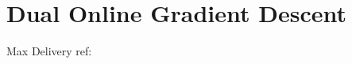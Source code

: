 \documentclass[../main.tex]{subfiles}
\begin{document}
	\chapter{Dual Online Gradient Descent}
	
	
	\begin{section}{Max Delivery}
		ref: \cite{gao2022bidding} \cite{balseiro2019learning}
	\end{section}
	
\end{document}
